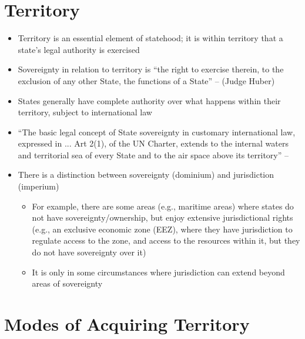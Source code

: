 \section{Territory}
\begin{itemize}
    \item Territory is an essential element of statehood; it is within territory that a state's legal authority is exercised
    \item Sovereignty in relation to territory is ``the right to exercise therein, to the exclusion of any other State, the functions of a State'' --  (Judge Huber)
    \item States generally have complete authority over what happens within their territory, subject to international law
    \item ``The basic legal concept of State sovereignty in customary international law, expressed in ... Art 2(1), of the UN Charter, extends to the internal waters and territorial sea of every State and to the air space above its territory'' -- 
    \item There is a distinction between sovereignty (dominium) and jurisdiction (imperium)
    \begin{itemize}
        \item For example, there are some areas (e.g., maritime areas) where states do not have sovereignty/ownership, but enjoy extensive jurisdictional rights (e.g., an exclusive economic zone (EEZ), where they have jurisdiction to regulate access to the zone, and access to the resources within it, but they do not have sovereignty over it)
        \item It is only in some circumstances where jurisdiction can extend beyond areas of sovereignty
    \end{itemize}
\end{itemize}

\section{Modes of Acquiring Territory}
